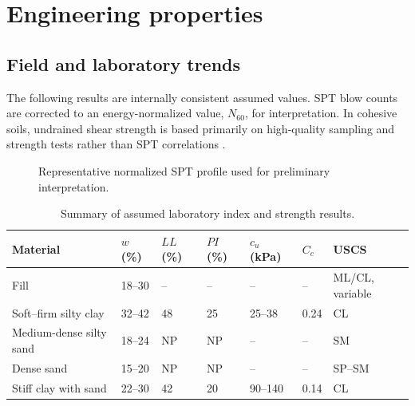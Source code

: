 \section{Engineering properties}
\subsection{Field and laboratory trends}
The following results are internally consistent assumed values. SPT blow counts are corrected
to an energy-normalized value, $N_{60}$, for interpretation. In cohesive soils, undrained shear
strength is based primarily on high-quality sampling and strength tests rather than SPT
correlations \cite{lambe1969}.

\begin{figure}[H]
\centering
{}
\caption{Representative normalized SPT profile used for preliminary interpretation.}
\label{fig:spt}
\end{figure}

\begin{table}[H]
\centering
\caption{Summary of assumed laboratory index and strength results.}
\label{tab:lab}
\small
\begin{tabularx}{\textwidth}{@{}L{35mm}C{16mm}C{16mm}C{16mm}C{18mm}C{18mm}Y@{}}
\toprule
{}
\textbf{Material} & $w$ (\%) & $LL$ (\%) & $PI$ (\%) & $c_u$ (kPa) & $C_c$ & \textbf{USCS} \\
\midrule
Fill & 18--30 & -- & -- & -- & -- & ML/CL, variable \\
Soft--firm silty clay & 32--42 & 48 & 25 & 25--38 & 0.24 & CL \\
Medium-dense silty sand & 18--24 & NP & NP & -- & -- & SM \\
Dense sand & 15--20 & NP & NP & -- & -- & SP--SM \\
Stiff clay with sand & 22--30 & 42 & 20 & 90--140 & 0.14 & CL \\
\bottomrule
\end{tabularx}
\end{table}

